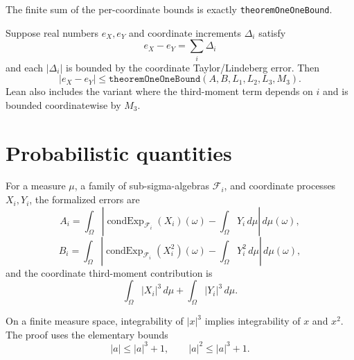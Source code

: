 \begin{lemma}\label{lem:sum-coordinate-bound}
\leanok
The finite sum of the per-coordinate bounds is exactly
\texttt{theoremOneOneBound}.
\end{lemma}

\begin{theorem}\label{thm:deterministic-telescope}
\leanok
Suppose real numbers \(e_X,e_Y\) and coordinate increments \(\Delta_i\)
satisfy
\[
  e_X-e_Y=\sum_i \Delta_i
\]
and each \(|\Delta_i|\) is bounded by the coordinate Taylor/Lindeberg error.
Then
\[
  |e_X-e_Y|\le \texttt{theoremOneOneBound}(A,B,L_1,L_2,L_3,M_3).
\]
Lean also includes the variant where the third-moment term depends on \(i\)
and is bounded coordinatewise by \(M_3\).
\end{theorem}

\section{Probabilistic quantities}

\begin{definition}\label{def:moment-errors}
\leanok
For a measure \(\mu\), a family of sub-sigma-algebras \(\mathcal F_i\), and
coordinate processes \(X_i,Y_i\), the formalized errors are
\[
  A_i =
  \int_\Omega
    \left|
      \operatorname{condExp}_{\mathcal F_i}(X_i)(\omega)
      - \int_\Omega Y_i\,d\mu
    \right|\,d\mu(\omega),
\]
\[
  B_i =
  \int_\Omega
    \left|
      \operatorname{condExp}_{\mathcal F_i}(X_i^2)(\omega)
      - \int_\Omega Y_i^2\,d\mu
    \right|\,d\mu(\omega),
\]
and the coordinate third-moment contribution is
\[
  \int_\Omega |X_i|^3\,d\mu+\int_\Omega |Y_i|^3\,d\mu .
\]
\end{definition}

\begin{lemma}\label{lem:third-moment-integrability}
\leanok
On a finite measure space, integrability of \(|x|^3\) implies integrability
of \(x\) and \(x^2\).  The proof uses the elementary bounds
\[
  |a|\le |a|^3+1,
  \qquad
  |a|^2\le |a|^3+1 .
\]
\end{lemma}

